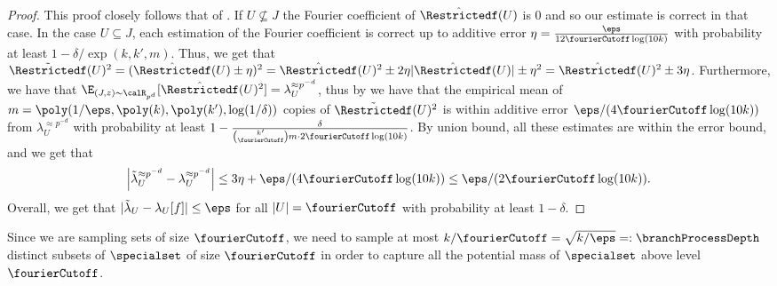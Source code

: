 \begin{proof}
This proof closely follows that of .
If $U \not\subseteq J$ the Fourier coefficient of $\hat{\Restrictedf}(U)$ is $0$ and so our estimate is correct in that case. In the case $U \subseteq J$, each estimation of the Fourier coefficient is correct up to additive error $\eta = \frac{\eps}{12\fourierCutoff\log(10k)}$ with probability at least $1-\delta/\exp(k,k',m)$.
Thus, we get that $\tilde{\Restrictedf}(U)^2 = (\hat{\Restrictedf}(U) \pm \eta)^2 = \hat{\Restrictedf}(U)^2  \pm 2\eta|\hat{\Restrictedf}(U)| \pm \eta^2 = \hat{\Restrictedf}(U)^2 \pm 3\eta$.
Furthermore, we have that $\E_{(J,z)\sim \calR_{p^{d}}}[\hat{\Restrictedf}(U)^2] = \lambda_U^{\approx p^{-d}}$, thus by  we have that the empirical mean of $m = \poly(1/\eps,\poly(k), \poly(k'), \log(1/\delta))$ copies of  $\tilde{\Restrictedf}(U)^2$ is within additive error $\eps/(4\fourierCutoff\log(10k))$ from $\lambda_U^{\approx p^{-d}}$ with probability at least  $1-\frac{\delta}{\binom{k'}{\fourierCutoff}m\cdot 2\fourierCutoff\log(10k)}$. 
By union bound, all these estimates are within the error bound, and we get that
%
$$\left|\tilde{\lambda}_U^{\approx p^{-d}} - \lambda_U^{\approx p^{-d}}\right| \le 3\eta + \eps/(4 \fourierCutoff\log(10k)) \le \eps/(2\fourierCutoff\log(10k)).$$
Overall, we get that $|\tilde{\lambda}_U - \lambda_U[f]| \le \eps$ for all $|U| = \fourierCutoff$ with probability at least $1-\delta$.
\end{proof}

Since we are sampling sets of size $\fourierCutoff$, we need to sample at most $k/\fourierCutoff = \sqrt{k/\eps} =: \branchProcessDepth$ distinct subsets of $\specialset$ of size $\fourierCutoff$ in order to capture all the potential mass of $\specialset$ above level $\fourierCutoff$. 

